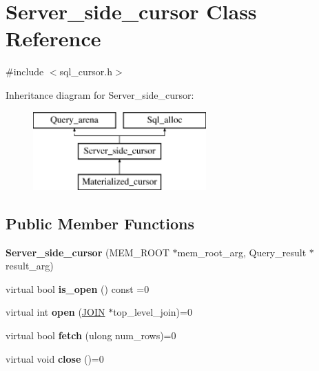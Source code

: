 \hypertarget{classServer__side__cursor}{}\section{Server\+\_\+side\+\_\+cursor Class Reference}
\label{classServer__side__cursor}


{\ttfamily \#include $<$sql\+\_\+cursor.\+h$>$}

Inheritance diagram for Server\+\_\+side\+\_\+cursor\+:\begin{figure}[H]
\begin{center}
\leavevmode
\includegraphics[height=3.000000cm]{classServer__side__cursor}
\end{center}
\end{figure}
\subsection*{Public Member Functions}
\begin{DoxyCompactItemize}
\item 
\mbox{\label{classServer__side__cursor_a63fc1156809024d925c6e2b03791d9f2}} 
{\bfseries Server\+\_\+side\+\_\+cursor} (M\+E\+M\+\_\+\+R\+O\+OT $\ast$mem\+\_\+root\+\_\+arg, Query\+\_\+result $\ast$result\+\_\+arg)
\item 
\mbox{\label{classServer__side__cursor_a9b77af4457e366fffdbb0f54f9d0892c}} 
virtual bool {\bfseries is\+\_\+open} () const =0
\item 
\mbox{\label{classServer__side__cursor_ac3b61969483a18c9b58f88831290b23d}} 
virtual int {\bfseries open} (\mbox{\hyperlink{classJOIN}{J\+O\+IN}} $\ast$top\+\_\+level\+\_\+join)=0
\item 
\mbox{\label{classServer__side__cursor_a36cb8a2dd72132b5ebba82fe245d8856}} 
virtual bool {\bfseries fetch} (ulong num\+\_\+rows)=0
\item 
\mbox{\label{classServer__side__cursor_a52b8489d5d4624896211e6370b0506ee}} 
virtual void {\bfseries close} ()=0
\end{DoxyCompactItemize}
